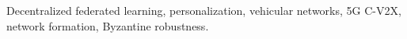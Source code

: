 \documentclass[lettersize,journal]{IEEEtran}
\begin{document}
\begin{IEEEkeywords}
	Decentralized federated learning, personalization, vehicular networks, 5G C-V2X, network formation, Byzantine robustness.
\end{IEEEkeywords}












\appendix

\end{document}
